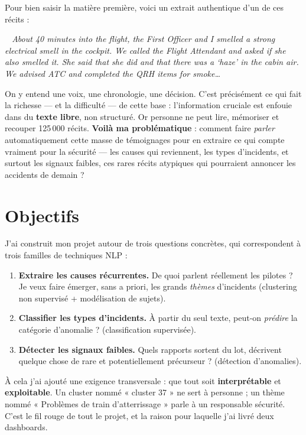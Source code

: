 \documentclass[11pt,a4paper]{article}
\newenvironment{narr}{%
  \begin{list}{}{\setlength{\leftmargin}{1.2em}\setlength{\rightmargin}{1.2em}}\item[]%
  \small\itshape\color{nblue}\guillemotleft~}{~\guillemotright\end{list}}
\begin{document}
Pour bien saisir la matière première, voici un extrait authentique d'un de ces récits :

\begin{narr}
About 40 minutes into the flight, the First Officer and I smelled a strong electrical
smell in the cockpit. We called the Flight Attendant and asked if she also smelled it.
She said that she did and that there was a `haze' in the cabin air. We advised ATC and
completed the QRH items for smoke\ldots
\end{narr}

\noindent On y entend une voix, une chronologie, une décision. C'est précisément ce qui
fait la richesse — et la difficulté — de cette base : l'information cruciale est
enfouie dans du \textbf{texte libre}, non structuré. Or personne ne peut lire, mémoriser
et recouper 125\,000 récits. \textbf{Voilà ma problématique} : comment faire \emph{parler}
automatiquement cette masse de témoignages pour en extraire ce qui compte vraiment pour
la sécurité — les causes qui reviennent, les types d'incidents, et surtout les signaux
faibles, ces rares récits atypiques qui pourraient annoncer les accidents de demain ?

\section{Objectifs}

J'ai construit mon projet autour de trois questions concrètes, qui correspondent à trois
familles de techniques NLP :

\begin{enumerate}[leftmargin=1.5em]
  \item \textbf{Extraire les causes récurrentes.} De quoi parlent réellement les pilotes ?
  Je veux faire émerger, sans a priori, les grands \emph{thèmes} d'incidents
  (clustering non supervisé + modélisation de sujets).
  \item \textbf{Classifier les types d'incidents.} À partir du seul texte, peut-on
  \emph{prédire} la catégorie d'anomalie ? (classification supervisée).
  \item \textbf{Détecter les signaux faibles.} Quels rapports sortent du lot, décrivent
  quelque chose de rare et potentiellement précurseur ? (détection d'anomalies).
\end{enumerate}

\noindent À cela j'ai ajouté une exigence transversale : que tout soit \textbf{interprétable}
et \textbf{exploitable}. Un cluster nommé « cluster 37 » ne sert à personne ; un thème
nommé « Problèmes de train d'atterrissage » parle à un responsable sécurité. C'est le fil
rouge de tout le projet, et la raison pour laquelle j'ai livré deux dashboards.
\end{document}
